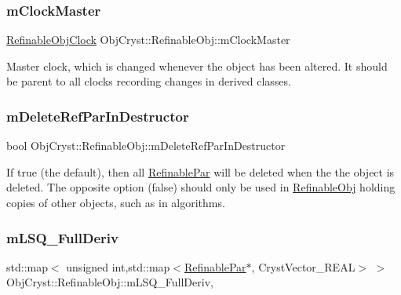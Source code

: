 \subsubsection{\texorpdfstring{mClockMaster}{mClockMaster}}
{\footnotesize\ttfamily \mbox{\hyperlink{class_obj_cryst_1_1_refinable_obj_clock}{Refinable\+Obj\+Clock}} Obj\+Cryst\+::\+Refinable\+Obj\+::m\+Clock\+Master\hspace{0.3cm}{\ttfamily [protected]}}

Master clock, which is changed whenever the object has been altered. It should be parent to all clocks recording changes in derived classes. \mbox{\label{class_obj_cryst_1_1_refinable_obj_a8e3295302c9a1f9ea29f1749132e561b}} 
\subsubsection{\texorpdfstring{mDeleteRefParInDestructor}{mDeleteRefParInDestructor}}
{\footnotesize\ttfamily bool Obj\+Cryst\+::\+Refinable\+Obj\+::m\+Delete\+Ref\+Par\+In\+Destructor\hspace{0.3cm}{\ttfamily [protected]}}

If true (the default), then all \mbox{\hyperlink{class_obj_cryst_1_1_refinable_par}{Refinable\+Par}} will be deleted when the the object is deleted. The opposite option (false) should only be used in \mbox{\hyperlink{class_obj_cryst_1_1_refinable_obj}{Refinable\+Obj}} holding \textquotesingle{}copies\textquotesingle{} of other objects, such as in algorithms. \mbox{\label{class_obj_cryst_1_1_refinable_obj_a7fded30f5419980ea110a651d6617cc0}} 
\subsubsection{\texorpdfstring{mLSQ\_FullDeriv}{mLSQ\_FullDeriv}}
{\footnotesize\ttfamily std\+::map$<$ unsigned int,std\+::map$<$\mbox{\hyperlink{class_obj_cryst_1_1_refinable_par}{Refinable\+Par}}$\ast$, Cryst\+Vector\+\_\+\+R\+E\+AL$>$ $>$ Obj\+Cryst\+::\+Refinable\+Obj\+::m\+L\+S\+Q\+\_\+\+Full\+Deriv\hspace{0.3cm}{\ttfamily [mutable]}, {\ttfamily [protected]}}

